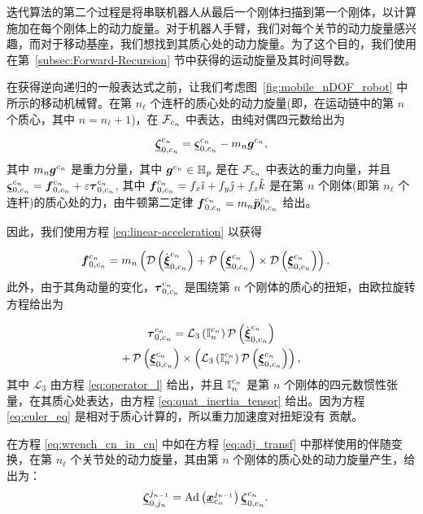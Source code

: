 迭代算法的第二个过程是将串联机器人从最后一个刚体扫描到第一个刚体，以计算施加在每个刚体上的动力旋量。对于机器人手臂，我们对每个关节的动力旋量感兴趣，而对于移动基座，我们想找到其质心处的动力旋量。为了这个目的，我们使用在第~\ref{subsec:Forward-Recursion} 节中获得的运动旋量及其时间导数。

在获得逆向递归的一般表达式之前，让我们考虑图~\ref{fig:mobile_nDOF_robot} 中所示的移动机械臂。在第 $n_{\ell}$ 个连杆的质心处的动力旋量(即，在运动链中的第 $n$ 个质心，其中 $n=n_{\ell}+1$)，在 $\mathcal{F}_{c_{n}}$ 中表达，由纯对偶四元数给出为

\begin{equation}
\underline{\boldsymbol{\zeta}}_{0,c_{n}}^{c_{n}}=\underline{\boldsymbol{\varsigma}}_{0,c_{n}}^{c_{n}}-m_{n}\boldsymbol{g}^{c_{n}},\label{eq:wrench_cn_in_cn}
\end{equation}
其中 $m_{n}\boldsymbol{g}^{c_{n}}$ 是重力分量，其中
$\boldsymbol{g}^{c_{n}}\in\mathbb{H}_{p}$ 是在 $\mathcal{F}_{c_{n}}$ 中表达的重力向量，并且 $\underline{\boldsymbol{\varsigma}}_{0,c_{n}}^{c_{n}}=\boldsymbol{f}_{0,c_{n}}^{c_{n}}+\varepsilon\boldsymbol{\tau}_{0,c_{n}}^{c_{n}}$,
其中 $\boldsymbol{f}_{0,c_{n}}^{c_{n}}=f_{x}\hat{\imath}+f_{y}\hat{\jmath}+f_{z}\hat{k}$
是在第 $n$ 个刚体(即第 $n_{\ell}$ 个连杆)的质心处的力，由牛顿第二定律 $\boldsymbol{f}_{0,c_{n}}^{c_{n}}=m_{n}\ddot{\boldsymbol{p}}_{0,c_{n}}^{c_{n}}$ 给出。


因此，我们使用方程 \eqref{eq:linear-acceleration} 以获得

\begin{align}
\boldsymbol{f}_{0,c_{n}}^{c_{n}} & =m_{n}\left(\operatorname{\mathcal{D}}\left(\dot{\underline{\boldsymbol{\xi}}}_{0,c_{n}}^{c_{n}}\right)+\operatorname{\mathcal{P}}\left(\underline{\boldsymbol{\xi}}_{0,c_{n}}^{c_{n}}\right)\times\operatorname{\mathcal{D}}\left(\underline{\boldsymbol{\xi}}_{0,c_{n}}^{c_{n}}\right)\right).\label{eq:newton_sec_law}
\end{align}
此外，由于其角动量的变化，$\boldsymbol{\tau}_{0,c_{n}}^{c_{n}}$ 是围绕第 $n$ 个刚体的质心的扭矩，由欧拉旋转方程给出为

\begin{multline}
\boldsymbol{\tau}_{0,c_{n}}^{c_{n}}=\mathcal{L}_{3}\left(\boldsymbol{\mathbb{I}}_{n}^{c_{n}}\right)\operatorname{\mathcal{P}}\left(\dot{\underline{\boldsymbol{\xi}}}_{0,c_{n}}^{c_{n}}\right)\\
+\operatorname{\mathcal{P}}\left(\underline{\boldsymbol{\xi}}_{0,c_{n}}^{c_{n}}\right)\times\left(\mathcal{L}_{3}\left(\boldsymbol{\mathbb{I}}_{n}^{c_{n}}\right)\operatorname{\mathcal{P}}\left(\underline{\boldsymbol{\xi}}_{0,c_{n}}^{c_{n}}\right)\right),\label{eq:euler_eq}
\end{multline}
其中 $\mathcal{L}_{3}$ 由方程 \eqref{eq:operator_l} 给出，并且 $\boldsymbol{\mathbb{I}}_{n}^{c_{n}}$
是第 $n$ 个刚体的四元数惯性张量，在其质心处表达，由方程 \eqref{eq:quat_inertia_tensor} 给出。因为方程 \eqref{eq:euler_eq} 是相对于质心计算的，所以重力加速度对扭矩没有
贡献。

在方程 \eqref{eq:wrench_cn_in_cn} 中如在方程 \eqref{eq:adj_transf} 中那样使用的伴随变换，在第 $n_{\ell}$ 个关节处的动力旋量，其由第 $n$ 个刚体的质心处的动力旋量产生，给出为：
\begin{align}
\underline{\boldsymbol{\zeta}}_{0,j_{n}}^{j_{n-1}} & =\mathrm{Ad}\left(\underline{\boldsymbol{x}}_{c_{n}}^{j_{n-1}}\right)\underline{\boldsymbol{\zeta}}_{0,c_{n}}^{c_{n}}.\label{eq:wrench_cn_in_jnMinus1}
\end{align}

